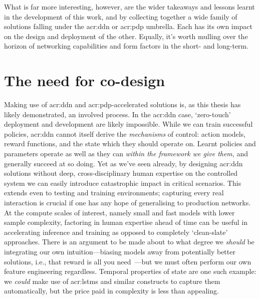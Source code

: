 What is far more interesting, however, are the wider takeaways and lessons learnt in the development of this work, and by collecting together a wide family of solutions falling under the \gls{acr:ddn} or \gls{acr:pdp} umbrella.
Each has its own impact on the design and deployment of the other.
Equally, it's worth mulling over the horizon of networking capabilities and form factors in the short- and long-term.

\section{The need for co-design}
Making use of \gls{acr:ddn} and \gls{acr:pdp}-accelerated solutions is, as this thesis has likely demonstrated, an involved process.
In the \gls{acr:ddn} case, `zero-touch' deployment and development are likely impossible.
While we can train successful policies, \gls{acr:ddn} cannot itself derive the \emph{mechanisms} of control: action models, reward functions, and the state which they should operate on.
Learnt policies and parameters operate as well as they can \emph{within the framework we give them}, and generally succeed at so doing.
Yet as we've seen already, by designing \gls{acr:ddn} solutions without deep, cross-disciplinary human expertise on the controlled system we can easily introduce catastrophic impact in critical scenarios.
This extends even to testing and training environments; capturing every real interaction is crucial if one has any hope of generalising to production networks.
At the compute scales of interest, namely small and fast models with lower sample complexity, factoring in human expertise ahead of time can be useful in accelerating inference and training as opposed to completely `clean-slate' approaches.
There is an argument to be made about to what degree we \emph{should} be integrating our own intuition---biasing models away from potentially better solutions, i.e., that reward is all you need~\parencite{DBLP:journals/ai/SilverSPS21}---but we must often perform our own feature engineering regardless.
Temporal properties of state are one such example: we \emph{could} make use of \glspl{acr:lstm} and similar constructs to capture them automatically, but the price paid in complexity is less than appealing.
%
%

